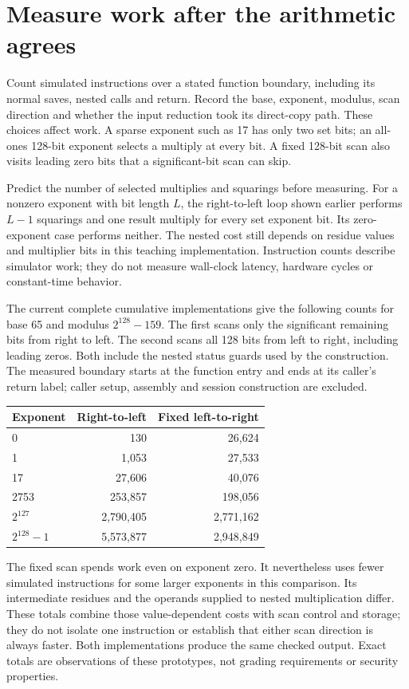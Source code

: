 \section{Measure work after the arithmetic agrees}
Count simulated instructions over a stated function boundary, including its normal
saves, nested calls and return. Record the base, exponent, modulus, scan direction and
whether the input reduction took its direct-copy path. These choices affect work.
A sparse exponent such as 17 has only two set bits; an all-ones 128-bit exponent
selects a multiply at every bit. A fixed 128-bit scan also visits leading zero bits
that a significant-bit scan can skip.

Predict the number of selected multiplies and squarings before measuring. For a
nonzero exponent with bit length \(L\), the right-to-left loop shown earlier performs
\(L-1\) squarings and one result multiply for every set exponent bit. Its zero-exponent
case performs neither. The nested cost still depends on residue values and multiplier
bits in this teaching implementation. Instruction counts describe simulator work;
they do not measure wall-clock latency, hardware cycles or constant-time behavior.

The current complete cumulative implementations give the following counts for base 65 and modulus
\(2^{128}-159\). The first scans only the significant remaining bits from right to
left. The second scans all 128 bits from left to right, including leading zeros.
Both include the nested status guards used by the construction.
The measured boundary starts at the function entry and ends at its caller's return
label; caller setup, assembly and session construction are excluded.
\begin{center}
  \begin{tabular}{lrr}
    Exponent      & Right-to-left & Fixed left-to-right \\
    \hline
    0             & 130           & 26,624              \\
    1             & 1,053         & 27,533              \\
    17            & 27,606        & 40,076              \\
    2753          & 253,857       & 198,056             \\
    \(2^{127}\)   & 2,790,405     & 2,771,162           \\
    \(2^{128}-1\) & 5,573,877     & 2,948,849           \\
  \end{tabular}
\end{center}
The fixed scan spends work even on exponent zero. It nevertheless uses fewer simulated
instructions for some larger exponents in this comparison. Its intermediate residues
and the operands supplied to nested multiplication differ. These totals combine those
value-dependent costs with scan control and storage; they do not isolate one instruction
or establish that either scan direction is always faster. Both implementations produce
the same checked output. Exact totals are observations of these prototypes, not grading
requirements or security properties.

